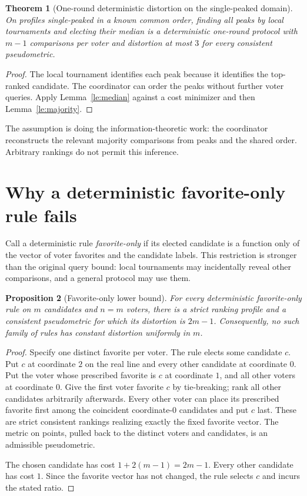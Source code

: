 \documentclass[11pt,a4paper]{article}
\newtheorem{theorem}{Theorem}[section]
\newtheorem{proposition}[theorem]{Proposition}
\theoremstyle{definition}
\theoremstyle{remark}
\begin{document}
\begin{theorem}[One-round deterministic distortion on the single-peaked domain]
On profiles single-peaked in a known common order, finding all peaks by local tournaments and electing their median is a deterministic one-round protocol with $m-1$ comparisons per voter and distortion at most $3$ for every consistent pseudometric.
\end{theorem}
\begin{proof}
The local tournament identifies each peak because it identifies the top-ranked candidate. The coordinator can order the peaks without further voter queries. Apply Lemma~\ref{le:median} against a cost minimizer and then Lemma~\ref{le:majority}.
\end{proof}

The assumption is doing the information-theoretic work: the coordinator reconstructs the relevant majority comparisons from peaks and the shared order. Arbitrary rankings do not permit this inference.

\section{Why a deterministic favorite-only rule fails}
Call a deterministic rule \emph{favorite-only} if its elected candidate is a function only of the vector of voter favorites and the candidate labels. This restriction is stronger than the original query bound: local tournaments may incidentally reveal other comparisons, and a general protocol may use them.

\begin{proposition}[Favorite-only lower bound]\label{pr:lower}
For every deterministic favorite-only rule on $m$ candidates and $n=m$ voters, there is a strict ranking profile and a consistent pseudometric for which its distortion is $2m-1$. Consequently, no such family of rules has constant distortion uniformly in $m$.
\end{proposition}
\begin{proof}
Specify one distinct favorite per voter. The rule elects some candidate $c$. Put $c$ at coordinate $2$ on the real line and every other candidate at coordinate $0$. Put the voter whose prescribed favorite is $c$ at coordinate $1$, and all other voters at coordinate $0$. Give the first voter favorite $c$ by tie-breaking; rank all other candidates arbitrarily afterwards. Every other voter can place its prescribed favorite first among the coincident coordinate-$0$ candidates and put $c$ last. These are strict consistent rankings realizing exactly the fixed favorite vector. The metric on points, pulled back to the distinct voters and candidates, is an admissible pseudometric.

The chosen candidate has cost $1+2(m-1)=2m-1$. Every other candidate has cost $1$. Since the favorite vector has not changed, the rule selects $c$ and incurs the stated ratio.
\end{proof}
\end{document}
